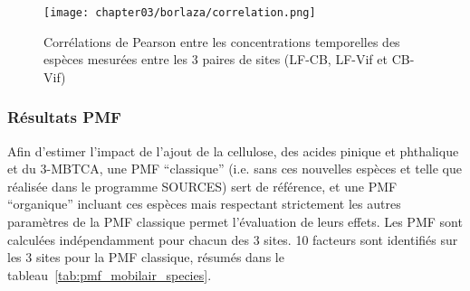 \begin{figure}[ht]
    \centering
    \texttt{[image: chapter03/borlaza/correlation.png]}
    \caption{Corrélations de Pearson entre les concentrations temporelles des espèces
        mesurées entre les 3 paires de sites (LF-CB, LF-Vif et CB-Vif)}%
    \label{fig:chapter03/borlaza/correlation}
\end{figure}

\subsubsection{Résultats PMF}%
\label{ssub:résultats_pmf}

Afin d'estimer l'impact de l'ajout de la cellulose, des acides pinique et phthalique et
du 3-MBTCA, une PMF ``classique'' (i.e. sans ces nouvelles espèces et telle que
réalisée dans le programme SOURCES) sert de référence, et une PMF ``organique'' incluant
ces espèces mais respectant strictement les autres paramètres de la PMF classique permet
l'évaluation de leurs effets.  Les PMF sont calculées indépendamment pour chacun des 3
sites.  10 facteurs sont identifiés sur les 3 sites pour la PMF classique, résumés dans
le tableau~\ref{tab:pmf_mobilair_species}.

